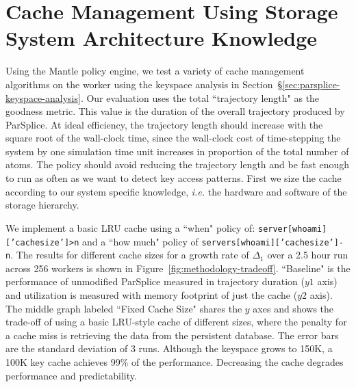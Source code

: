 %
%
%
%

\section{Cache Management Using Storage System Architecture Knowledge}
\label{sec:arch-specific}

Using the Mantle policy engine, we test a variety of cache management 
algorithms on the worker using the keyspace analysis in
Section~\S\ref{sec:parsplice-keyspace-analysis}.  Our evaluation uses the total
``trajectory length" as the goodness metric. This value is the duration of the
overall trajectory produced by ParSplice. At ideal efficiency, the trajectory
length should increase with the square root of the wall-clock time, since the
wall-clock cost of time-stepping the system by one simulation time unit
increases in proportion of the total number of atoms.  The policy should avoid
reducing the trajectory length and be fast enough to run as often as we want to
detect key access patterns.  First we size the cache according to our system
specific knowledge, {\it i.e.} the hardware and software of the storage
hierarchy.

We implement a basic LRU cache using a ``when" policy of:
\texttt{server[whoami]['cachesize']>n} and a ``how much" policy of
\texttt{servers[whoami]['cachesize']-n}.  The results for different cache sizes
for a growth rate of \(\Delta_1\) over a 2.5 hour run across 256 workers is
shown in Figure~\ref{fig:methodology-tradeoff}.  ``Baseline" is the performance
of unmodified ParSplice  measured in trajectory duration (\(y1\) axis) and
utilization is measured with memory footprint of just the cache (\(y2\) axis).
The middle graph labeled ``Fixed Cache Size" shares the \(y\) axes and shows
the trade-off of using a basic LRU-style cache of different sizes, where the
penalty for a cache miss is retrieving the data from the persistent database.
The error bars are the standard deviation of 3 runs.  Although the keyspace
grows to 150K, a 100K key cache achieves 99\% of the performance. Decreasing
the cache degrades performance and predictability.

